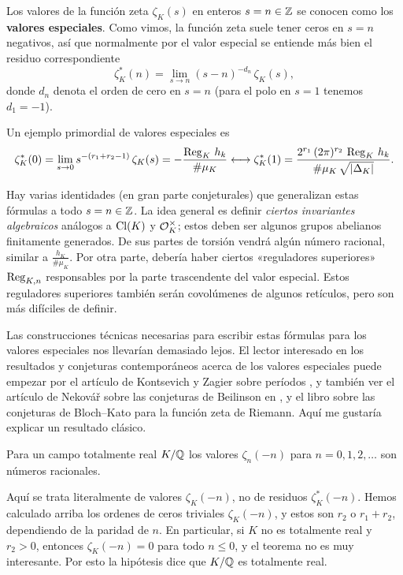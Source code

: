 Los valores de la función zeta $\zeta_K (s)$ en enteros $s = n \in \mathbb{Z}$ se
conocen como los \textbf{valores especiales}. Como vimos, la función zeta suele
tener ceros en $s = n$ negativos, así que normalmente por el valor especial se
entiende más bien el residuo correspondiente
$$\zeta_K^* (n) = \lim_{s \to n} (s-n)^{-d_n}\,\zeta_K (s),$$
donde $d_n$ denota el orden de cero en $s = n$ (para el polo en $s = 1$ tenemos
$d_1 = -1$).

Un ejemplo primordial de valores especiales es
\[ \zeta_K^* (0) = \lim_{s \to 0} s^{-(r_1 + r_2 - 1)}\,\zeta_K (s) = -\frac{\operatorname{Reg}_K\,h_k}{\# \mu_K}
   \longleftrightarrow
   \zeta_K^* (1) = \frac{2^{r_1}\,(2\pi)^{r_2}\,\operatorname{Reg}_K\,h_k}{\#\mu_K\,\sqrt{|\Delta_K|}}. \]

Hay varias identidades (en gran parte conjeturales) que generalizan estas
fórmulas a todo $s = n \in \mathbb{Z}$. La idea general es definir
\emph{ciertos invariantes algebraicos} análogos a $\operatorname{Cl} (K)$ y $\mathcal{O}_K^\times$;
estos deben ser algunos grupos abelianos finitamente generados. De sus partes de
torsión vendrá algún número racional, similar a $\frac{h_K}{\# \mu_K}$.
Por otra parte, debería haber ciertos «reguladores superiores» $\operatorname{Reg}_{K,n}$
responsables por la parte trascendente del valor especial. Estos reguladores
superiores también serán covolúmenes de algunos retículos, pero son más
difíciles de definir.

Las construcciones técnicas necesarias para escribir estas fórmulas para los
valores especiales nos llevarían demasiado lejos. El lector interesado en los
resultados y conjeturas contemporáneos acerca de los valores especiales puede
empezar por el artículo de Kontsevich y Zagier sobre períodos
\cite{Kontsevich-Zagier}, y también ver el artículo de Nekov\'a\v{r} sobre las
conjeturas de Beilinson en \cite{Motives-I}, y el libro
\cite{Bloch-Kato-for-riemann-zeta} sobre las conjeturas de Bloch--Kato para la
función zeta de Riemann. Aquí me gustaría explicar un resultado clásico.

\begin{teorema}
  Para un campo totalmente real $K/\mathbb{Q}$ los valores $\zeta_n (-n)$ para
  $n = 0,1,2,\ldots$ son números racionales.
\end{teorema}

Aquí se trata literalmente de valores $\zeta_K (-n)$, no de residuos
$\zeta_K^* (-n)$. Hemos calculado arriba los ordenes de ceros triviales
$\zeta_K (-n)$, y estos son $r_2$ o $r_1 + r_2$, dependiendo de la paridad de
$n$. En particular, si $K$ no es totalmente real y $r_2 > 0$, entonces
$\zeta_K (-n) = 0$ para todo $n \le 0$, y el teorema no es muy interesante.
Por esto la hipótesis dice que $K/\mathbb{Q}$ es totalmente real.

